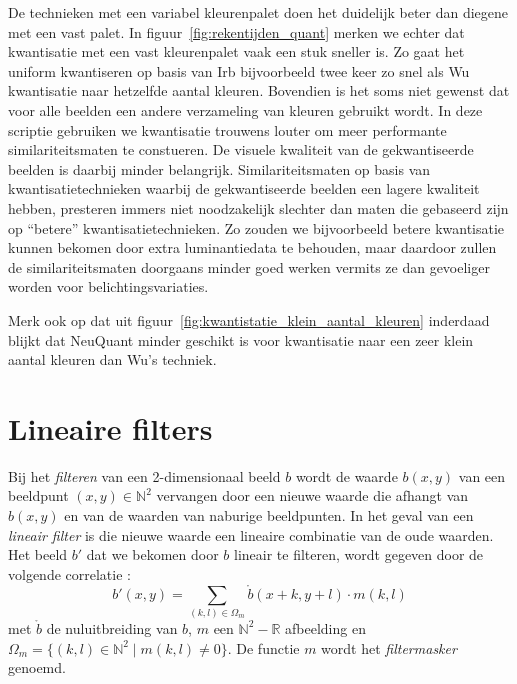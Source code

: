 De technieken met een variabel kleurenpalet doen het duidelijk beter dan diegene met een vast palet. 
In figuur~\ref{fig:rekentijden_quant} merken we echter dat kwantisatie met een vast kleurenpalet 
vaak een stuk sneller is. Zo gaat het uniform kwantiseren op basis van Irb bijvoorbeeld
twee keer zo snel als Wu kwantisatie naar hetzelfde aantal kleuren. Bovendien is het soms niet
gewenst dat voor alle beelden een andere verzameling van kleuren gebruikt wordt. In deze scriptie gebruiken
we kwantisatie trouwens louter om meer performante similariteitsmaten te constueren. De visuele kwaliteit
van de gekwantiseerde beelden is daarbij minder belangrijk. Similariteitsmaten op basis van kwantisatietechnieken 
waarbij de gekwantiseerde beelden een lagere kwaliteit hebben, presteren immers niet noodzakelijk
slechter dan maten die gebaseerd zijn op ``betere'' kwantisatietechnieken. Zo zouden we bijvoorbeeld 
betere kwantisatie kunnen bekomen door extra luminantiedata te behouden, maar daardoor zullen
de similariteitsmaten doorgaans minder goed werken vermits ze dan gevoeliger worden voor 
belichtingsvariaties.

Merk ook op dat uit figuur~\ref{fig:kwantistatie_klein_aantal_kleuren} inderdaad blijkt
dat NeuQuant minder geschikt is voor kwantisatie naar een zeer klein
aantal kleuren dan Wu's techniek. 

\section{Lineaire filters}
\label{sectie:lineaire_filters}

Bij het \emph{filteren} van een 2-dimensionaal beeld $b$ wordt de waarde $b(x,y)$ van een 
beeldpunt $(x,y) \in \mathbb{N}^2$ vervangen door een nieuwe waarde die afhangt van $b(x,y)$ 
en van de waarden van naburige beeldpunten. In het geval van een \emph{lineair filter} is die nieuwe waarde een lineaire combinatie 
van de oude waarden. Het beeld $b'$ dat we bekomen door $b$ lineair te filteren, wordt gegeven door
de volgende correlatie \cite{philips:beeldverwerking}:
\begin{displaymath}
b'(x,y) = \sum_{(k,l) \in \Omega_m} \mathring{b}(x+k,y+l) \cdot m(k,l)
\end{displaymath}
met $\mathring{b}$ de nuluitbreiding van $b$, $m$ een $\mathbb{N}^2 - \mathbb{R}$ afbeelding 
en $\Omega_m = \{ (k,l) \in \mathbb{N}^2 \mid m(k,l) \ne 0 \}$. 
De functie $m$ wordt het \emph{filtermasker} genoemd.

